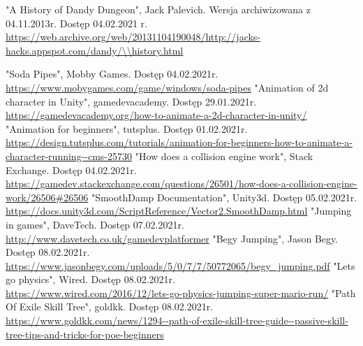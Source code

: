 \documentclass[oneside,polski,logo]{amuthesis}
\begin{document}
\begin{thebibliography}{100}
 "A History of Dandy Dungeon", Jack Palevich. Wersja archiwizowana z 04.11.2013r. Dostęp 04.02.2021 r.
\\ \url{https://web.archive.org/web/20131104190048/http://jacks-hacks.appspot.com/dandy/\\history.html}

"Soda Pipes", Mobby Games. Dostęp 04.02.2021r.
\\ \url{https://www.mobygames.com/game/windows/soda-pipes}
"Animation of 2d character in Unity", gamedevacademy. Dostęp 29.01.2021r.
\\ \url{https://gamedevacademy.org/how-to-animate-a-2d-character-in-unity/}
"Animation for beginners", tutsplus. Dostęp 01.02.2021r.
\\ \url{https://design.tutsplus.com/tutorials/animation-for-beginners-how-to-animate-a-character-running--cms-25730}
"How does a collision engine work", Stack Exchange. Dostęp 04.02.2021r.
\\ \url{https://gamedev.stackexchange.com/questions/26501/how-does-a-collision-engine-work/26506\#26506}
"SmoothDamp Documentation", Unity3d. Dostęp 05.02.2021r.
\\ \url{https://docs.unity3d.com/ScriptReference/Vector2.SmoothDamp.html}
"Jumping in games", DaveTech. Dostęp 07.02.2021r.
\\ \url{http://www.davetech.co.uk/gamedevplatformer}
"Begy Jumping", Jason Begy. Dostęp 08.02.2021r.
\\ \url{https://www.jasonbegy.com/uploads/5/0/7/7/50772065/begy\_jumping.pdf}
"Lets go physics", Wired. Dostęp 08.02.2021r.
\\ \url{https://www.wired.com/2016/12/lets-go-physics-jumping-super-mario-run/}
"Path Of Exile Skill Tree", goldkk. Dostęp 08.02.2021r.
\\ \url{https://www.goldkk.com/news/1294--path-of-exile-skill-tree-guide--passive-skill-tree-tips-and-tricks-for-poe-beginners}
\end{thebibliography}
\end{document}
